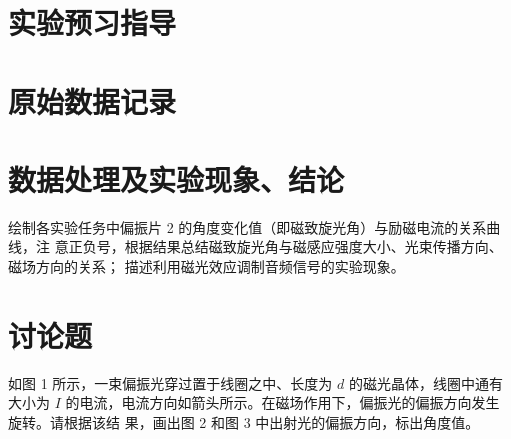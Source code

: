 \documentclass[signature=data]{physicsreport}
\begin{document}
\maketitle

\section{实验预习指导}
\newpage

\section{原始数据记录}
\makeatletter
{}
\makeatother

\newpage

\section{数据处理及实验现象、结论}

绘制各实验任务中偏振片 2 的角度变化值（即磁致旋光角）与励磁电流的关系曲线，注
意正负号，根据结果总结磁致旋光角与磁感应强度大小、光束传播方向、磁场方向的关系；
描述利用磁光效应调制音频信号的实验现象。


\newpage



\section{讨论题}

如图 1 所示，一束偏振光穿过置于线圈之中、长度为 $d$ 的磁光晶体，线圈中通有大小为
$I$ 的电流，电流方向如箭头所示。在磁场作用下，偏振光的偏振方向发生旋转。请根据该结
果，画出图 2 和图 3 中出射光的偏振方向，标出角度值。
\end{document}
